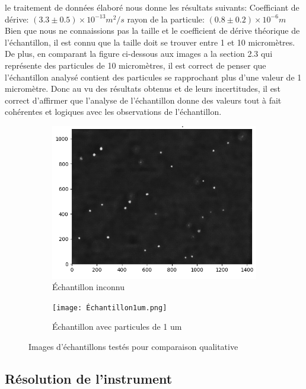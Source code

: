 \documentclass[11pt,letterpaper]{article}
\begin{document}
le traitement de données élaboré nous donne les résultats suivants: 
Coefficiant de dérive: $(3.3 \pm 0.5) \times 10^{-13} m^{2}/s$
rayon de la particule: $(0.8 \pm 0.2)\times 10^{-6} m$
Bien que nous ne connaissions pas la taille et le coefficient de dérive théorique de l'échantillon, il est connu que la taille doit se trouver 
entre 1 et 10 micromètres. De plus, en comparant  la figure ci-dessous aux images a la section 2.3 qui représente des particules de 10 micromètres, il est correct de penser 
que l'échantillon analysé contient des particules se rapprochant plus d'une valeur de 1 micromètre. Donc au vu des résultats obtenus et de leurs 
incertitudes, il est correct d'affirmer que l'analyse de l'échantillon donne des valeurs tout à fait cohérentes et logiques avec les observations de l'échantillon. 

\begin{figure}[H]
  \begin{subfigure}[H]{0.45\textwidth}
    \centering
    \includegraphics[width=\textwidth]{Test_cond_rapport.png}
    \caption{Échantillon inconnu}
  \end{subfigure}
  \hfill
  \begin{subfigure}[H]{0.45\textwidth}
    \centering
    \texttt{[image: Échantillon1um.png]}
    \caption{Échantillon avec particules de 1 um}
  \end{subfigure}
  \caption{Images d'échantillons testés pour comparaison qualitative}
\end{figure}

\subsection{Résolution de l'instrument}
\end{document}
